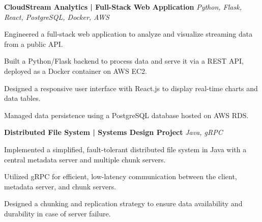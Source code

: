 \textbf{CloudStream Analytics | Full-Stack Web Application} \hfill \textit{Python, Flask, React, PostgreSQL, Docker, AWS}
\begin{itemize*}{\itemsep=0pt \topsep=0pt}
    \item Engineered a full-stack web application to analyze and visualize streaming data from a public API.
    \item Built a Python/Flask backend to process data and serve it via a REST API, deployed as a Docker container on AWS EC2.
    \item Designed a responsive user interface with React.js to display real-time charts and data tables.
    \item Managed data persistence using a PostgreSQL database hosted on AWS RDS.
\end{itemize*}
\vspace{5pt}
\textbf{Distributed File System | Systems Design Project} \hfill \textit{Java, gRPC}
\begin{itemize*}{\itemsep=0pt \topsep=0pt}
    \item Implemented a simplified, fault-tolerant distributed file system in Java with a central metadata server and multiple chunk servers.
    \item Utilized gRPC for efficient, low-latency communication between the client, metadata server, and chunk servers.
    \item Designed a chunking and replication strategy to ensure data availability and durability in case of server failure.
\end{itemize*}

